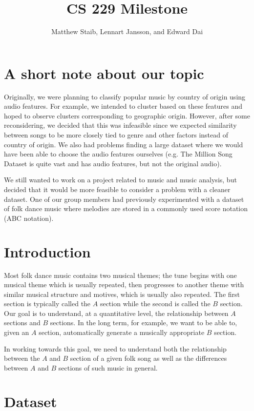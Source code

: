 \documentclass{article} %
\title{CS 229 Milestone}
\author{Matthew Staib, Lennart Jansson, and Edward Dai}
\begin{document}
\maketitle

\section{A short note about our topic}
Originally, we were planning to classify popular music by country of origin
using audio features. For example, we intended to cluster based on these
features and hoped to observe clusters corresponding to geographic origin.
However, after some reconsidering, we decided that this was infeasible since we
expected similarity between songs to be more closely tied to genre and other
factors instead of country of origin. We also had problems finding a large
dataset where we would have been able to choose the audio features ourselves
(e.g. The Million Song Dataset is quite vast and has audio features, but not the
original audio).

We still wanted to work on a project related to music and music analysis, but
decided that it would be more feasible to consider a problem with a cleaner
dataset. One of our group members had previously experimented with a dataset of
folk dance music where melodies are stored in a commonly used score notation
(ABC notation).

\section{Introduction}
Most folk dance music contains two musical themes; the tune begins with one
musical theme which is usually repeated, then progresses to another theme with
similar musical structure and motives, which is usually also repeated. The first
section is typically called the $A$ section while the second is called the $B$
section. Our goal is to understand, at a quantitative level, the relationship
between $A$ sections and $B$ sections. In the long term, for example, we want to
be able to, given an $A$ section, automatically generate a musically appropriate
$B$ section.

In working towards this goal, we need to understand both the relationship
between the $A$ and $B$ section of a given folk song as well as the differences
between $A$ and $B$ sections of such music in general. 

\section{Dataset}
\end{document}
